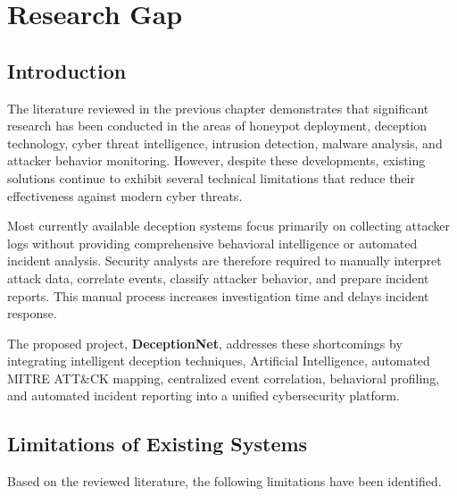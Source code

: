\documentclass[12pt,a4paper]{report}
\begin{document}
\clearpage






\chapter{Research Gap}

\section{Introduction}

The literature reviewed in the previous chapter demonstrates that significant research has been conducted in the areas of honeypot deployment, deception technology, cyber threat intelligence, intrusion detection, malware analysis, and attacker behavior monitoring. However, despite these developments, existing solutions continue to exhibit several technical limitations that reduce their effectiveness against modern cyber threats.

Most currently available deception systems focus primarily on collecting attacker logs without providing comprehensive behavioral intelligence or automated incident analysis. Security analysts are therefore required to manually interpret attack data, correlate events, classify attacker behavior, and prepare incident reports. This manual process increases investigation time and delays incident response.

The proposed project, \textbf{DeceptionNet}, addresses these shortcomings by integrating intelligent deception techniques, Artificial Intelligence, automated MITRE ATT\&CK mapping, centralized event correlation, behavioral profiling, and automated incident reporting into a unified cybersecurity platform.


\section{Limitations of Existing Systems}

Based on the reviewed literature, the following limitations have been identified.
\end{document}
